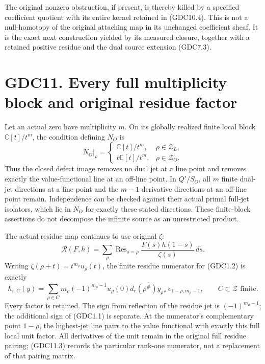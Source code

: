 The original nonzero obstruction, if present, is thereby killed by a
specified coefficient quotient with its entire kernel retained in
(GDC10.4). This is not a null-homotopy of the original attaching map in
its unchanged coefficient sheaf. It is the exact next construction
yielded by its measured closure, together with a retained positive
residue and the dual source extension (GDC7.3).

\section{GDC11. Every full multiplicity block and original residue
factor}\label{gdc11.-every-full-multiplicity-block-and-original-residue-factor}

Let an actual zero have multiplicity \(m\). On its globally realized
finite local block \(\mathbb C[t]/t^m\), the condition defining \(N_O\)
is \[
N_O|_\rho=
\begin{cases}
\mathbb C[t]/t^m,&\rho\in\mathscr Z_L,\\
t\mathbb C[t]/t^m,&\rho\in\mathscr Z_O.
\end{cases}
\tag{GDC11.1}
\] Thus the closed defect image removes no dual jet at a line point and
removes exactly the value-functional line at an off-line point. In
\(Q'/S_O\), all \(m\) finite dual-jet directions at a line point and the
\(m-1\) derivative directions at an off-line point remain. Independence
can be checked against their actual primal full-jet isolators, which lie
in \(N_O\) for exactly these stated directions. These finite-block
assertions do not decompose the infinite source as an unrestricted
product.

The actual residue map continues to use original \(\zeta\): \[
\mathcal R(F,h)=\sum_\rho\operatorname{Res}_{s=\rho}
\frac{F(s)h(1-s)}{\zeta(s)}\,ds.
\tag{GDC11.2}
\] Writing \(\zeta(\rho+t)=t^{m_\rho}u_\rho(t)\), the finite residue
numerator for (GDC1.2) is exactly \[
h_{r,C}(y)=\sum_{\rho\in C}
m_\rho(-1)^{m_\rho-1}u_\rho(0)
\overline{d_r(\rho^\#)y_{\rho^\#}}\,
e_{1-\rho,m_\rho-1},\qquad C\subset\mathscr Z\text{ finite}.
\tag{GDC11.3}
\] Every factor is retained. The sign from reflection of the residue jet
is \((-1)^{m_\rho-1}\); the additional sign of (GDC1.1) is separate. At
the numerator's complementary point \(1-\rho\), the highest-jet line
pairs to the value functional with exactly this full local unit factor.
All derivatives of the unit remain in the original full residue pairing;
(GDC11.3) records the particular rank-one numerator, not a replacement
of that pairing matrix.

